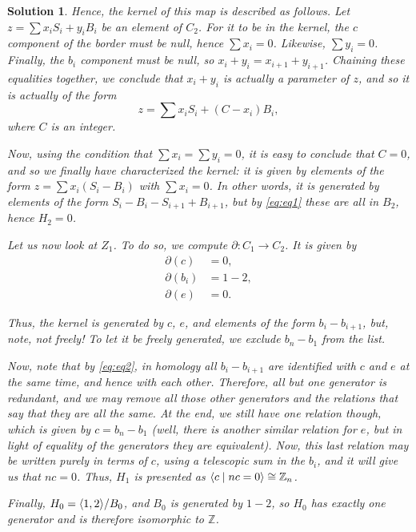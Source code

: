 \documentclass{article}
\theoremstyle{plain}
\theoremstyle{nonumberplain}
\newtheorem{sol}{Solution}
\newcommand{\Z}{\mathbb{Z}}
\DeclarePairedDelimiter{\braket}{\langle}{\rangle}
\begin{document}
\begin{sol}{}
Hence, the kernel of this map is described as follows. Let $z = \sum x_i S_i + y_i B_i$ be an element of $C_2$. For it to be in the kernel, the $c$ component of the border must be null, hence $\sum x_i = 0$. Likewise, $\sum y_i = 0$. Finally, the $b_i$ component must be null, so $x_i + y_i = x_{i+1} + y_{i+1}$. Chaining these equalities together, we conclude that $x_i + y_i$ is actually a parameter of $z$, and so it is actually of the form
\begin{equation}
z = \sum x_i S_i + (C - x_i) B_i,
\end{equation}
where $C$ is an integer.

Now, using the condition that $\sum x_i = \sum y_i = 0$, it is easy to conclude that $C = 0$, and so we finally have characterized the kernel: it is given by elements of the form $z = \sum x_i (S_i - B_i)$ with $\sum x_i = 0$. In other words, it is generated by elements of the form $S_i - B_i - S_{i+1} + B_{i+1}$, but by \eqref{eq:eq1} these are all in $B_2$, hence $H_2 = 0$.

Let us now look at $Z_1$. To do so, we compute $\partial \colon C_1 \to C_2$. It is given by
\begin{equation}
\begin{aligned}
\partial(c) &= 0,\\
\partial(b_i) &= 1-2,\\
\partial(e) &= 0.
\end{aligned}
\end{equation}

Thus, the kernel is generated by $c$, $e$, and elements of the form $b_i - b_{i+1}$, but, note, not freely! To let it be freely generated, we exclude $b_n - b_1$ from the list.

Now, note that by \eqref{eq:eq2}, in homology all $b_i - b_{i+1}$ are identified with $c$ and $e$ at the same time, and hence with each other. Therefore, all but one generator is redundant, and we may remove all those other generators and the relations that say that they are all the same. At the end, we still have one relation though, which is given by $c = b_n - b_1$ (well, there is another similar relation for $e$, but in light of equality of the generators they are equivalent). Now, this last relation may be written purely in terms of $c$, using a telescopic sum in the $b_i$, and it will give us that $nc = 0$. Thus, $H_1$ is presented as $\braket{c \mid nc = 0} \cong \Z_n$.

Finally, $H_0 = \braket{1,2} / B_0$, and $B_0$ is generated by $1-2$, so $H_0$ has exactly one generator and is therefore isomorphic to $\Z$.
\end{sol}
\end{document}
